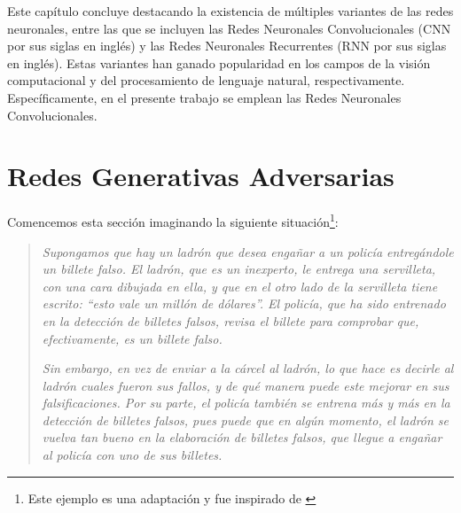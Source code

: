 {{    Este capítulo concluye destacando la existencia de múltiples variantes de las redes neuronales, entre las que se incluyen las Redes Neuronales Convolucionales (CNN por sus siglas en inglés) y las Redes Neuronales Recurrentes (RNN por sus siglas en inglés). Estas variantes han ganado popularidad en los campos de la visión computacional y del procesamiento de lenguaje natural, respectivamente. Específicamente, en el presente trabajo se emplean las Redes Neuronales Convolucionales.

}  %




\section{Redes Generativas Adversarias}\label{sec:redes-generativas-adversarias-GAN}
{
Comencemos esta sección imaginando la siguiente situación\footnote{Este ejemplo es una adaptación y fue inspirado de \cite[min. 4:32]{santana2017creando}}:
\begin{quotation}
    \textit{Supongamos que hay un ladrón que desea engañar a un policía entregándole un billete falso. El ladrón, que es un inexperto, le entrega una servilleta, con una cara dibujada en ella, y que en el otro lado de la servilleta tiene escrito: ``\emph{esto vale un millón de dólares}''. El policía, que ha sido entrenado en la detección de billetes falsos, revisa el billete para comprobar que, efectivamente, es un billete falso.}

    \textit{Sin embargo, en vez de enviar a la cárcel al ladrón, lo que hace es decirle al ladrón cuales fueron sus fallos, y de qué manera puede este mejorar en sus falsificaciones. Por su parte, el policía también se entrena más y más en la detección de billetes falsos, pues puede que en algún momento, el ladrón se vuelva tan bueno en la elaboración de billetes falsos, que llegue a engañar al policía con uno de sus billetes.}
\end{quotation}

}}
